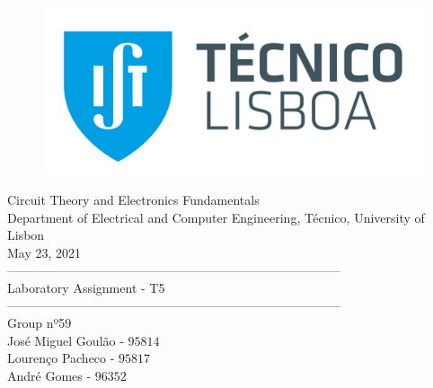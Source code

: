 
\thispagestyle {empty}


\begin{figure}[ht]
	\centering
	\includegraphics[width = 0.5\linewidth]{ist_foto}
\end{figure}


\begin{center}

	\vspace{2cm}
	{\FontLb Circuit Theory and Electronics Fundamentals} \\

	\vspace{0.5cm}
	{\FontSn Department of Electrical and Computer Engineering, Técnico, University of Lisbon} \\

	\vspace{0.5cm}
	{\FontSn May 23, 2021} \\

	\vspace{1cm}
	{\FontLb --------------------------------------------------------------------------------} \\
	\vspace{0.1cm}
	{\FontLb Laboratory Assignment - T5} \\
	{\FontLb --------------------------------------------------------------------------------} \\

	\vspace{1cm}
	{\FontMb Group nº59} \\
	\vspace{0.25cm}
	{\FontSn José Miguel Goulão - $95814$} \\
	{\FontSn Lourenço Pacheco - $95817$} \\
	{\FontSn André Gomes - $96352$} \\

	\vspace{.5cm}

\end{center}

